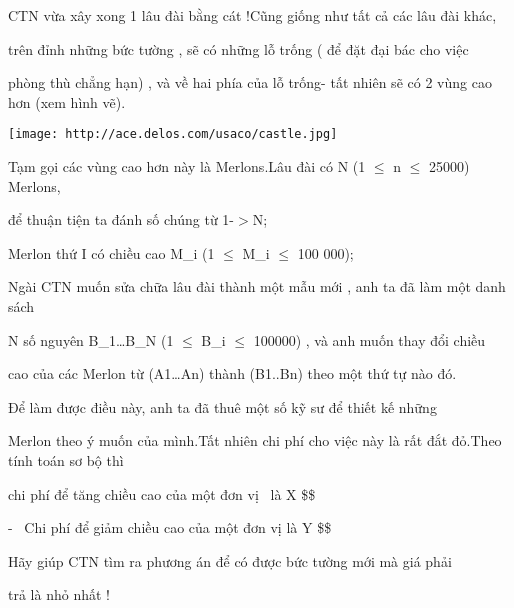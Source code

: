 CTN vừa xây xong 1 lâu đài bằng cát !Cũng giống như tất cả các lâu đài khác,  

   trên đỉnh những bức tường , sẽ có những lỗ trống ( để đặt đại bác cho việc  

   phòng thù chẳng hạn) , và về hai phía của lỗ trống- tất nhiên sẽ có 2 vùng cao hơn (xem hình vẽ).  


\texttt{[image: http://ace.delos.com/usaco/castle.jpg]}

   Tạm gọi các vùng cao hơn này là Merlons.Lâu đài có N (1 $\le$ n $\le$ 25000) Merlons,  

   để thuận tiện ta đánh số chúng từ 1-$>$N;  

   Merlon thứ I có chiều cao M\_i (1 $\le$ M\_i $\le$ 100 000);  

   Ngài CTN muốn sửa chữa lâu đài thành một mẫu mới , anh ta đã làm một danh sách  

   N số nguyên B\_1…B\_N (1 $\le$ B\_i $\le$ 100000) , và anh muốn thay đổi chiều  

   cao của các Merlon từ (A1…An) thành (B1..Bn) theo một thứ tự nào đó.  



   Để làm được điều này, anh ta đã thuê một số kỹ sư để thiết kế những  

   Merlon theo ý muốn của mình.Tất nhiên chi phí cho việc này là rất đắt đỏ.Theo tính toán sơ bộ thì  

   chi phí để tăng chiều cao của một đơn vị  là X \$\$  

   -  Chi phí để giảm chiều cao của một đơn vị là Y \$\$  

   Hãy giúp CTN tìm ra phương án để có được bức tường mới mà giá phải  

   trả là nhỏ nhất !  

\